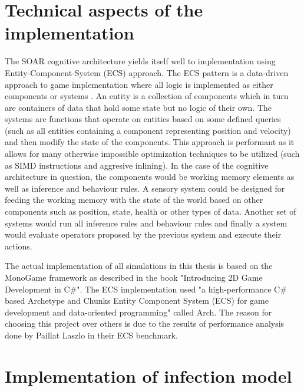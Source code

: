 \label{chapter:chapter2}

\section{Technical aspects of the implementation}

The SOAR cognitive architecture yields itself well to implementation using Entity-Component-System (ECS) approach.
The ECS pattern is a data-driven approach to game implementation where all logic is implemented as either components or systems \cite{raffaillac2019polyphony}.
An entity is a collection of components which in turn are containers of data that hold some state but no logic of their own.
The systems are functions that operate on entities based on some defined queries (such as all entities containing a component representing position and velocity) and then modify the state of the components.
This approach is performant as it allows for many otherwise impossible optimization techniques to be utilized (such as SIMD instructions and aggresive inlining)\cite{harkonen2019advantages}.
In the case of the cognitive architecture in question, the components would be working memory elements as well as inference and behaviour rules.
A sensory system could be designed for feeding the working memory with the state of the world based on other components such as position, state, health or other types of data.
Another set of systems would run all inference rules and behaviour rules and finally a system would evaluate operators proposed by the previous system and execute their actions.

The actual implementation of all simulations in this thesis is based on the MonoGame framework as described in the book "Introducing 2D Game Development in C\#"\cite{pavleas2013introducing}.
The ECS implementation used "a high-performance C\# based Archetype and Chunks Entity Component System (ECS) for game development and data-oriented programming" called Arch\cite{matthaeus2023arch}.
The reason for choosing this project over others is due to the results of performance analysis done by Paillat Laszlo in their ECS benchmark\cite{laszlo2023arch}.

\section{Implementation of infection model}

